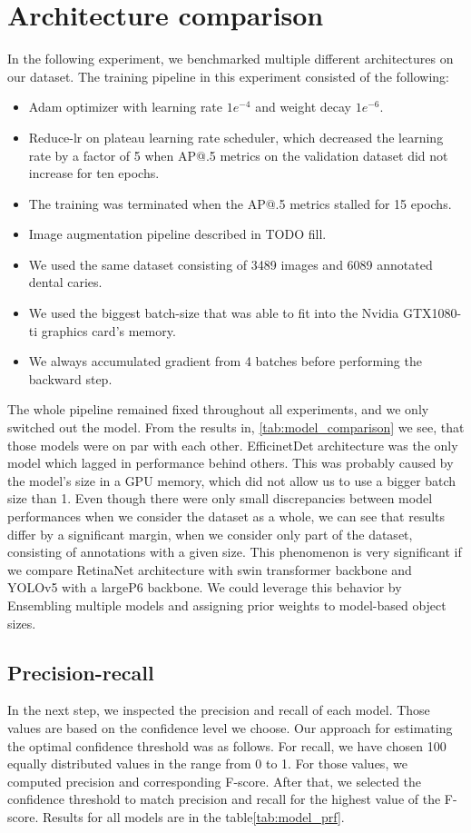 \section{Architecture comparison}
In the following experiment, we benchmarked multiple different architectures on our dataset. The training pipeline in this experiment consisted of the following:
\begin{itemize}
    \item  Adam optimizer with learning rate $1e^{-4}$ and weight decay $1e^{-6}$.
    \item Reduce-lr on plateau learning rate scheduler, which decreased the learning rate by a factor of 5 when AP@.5 metrics on the validation dataset did not increase for ten epochs.
    \item The training was terminated when the AP@.5 metrics stalled for 15 epochs.
    \item Image augmentation pipeline described in TODO fill.
    \item We used the same dataset consisting of 3489 images and 6089 annotated dental caries.
    \item We used the biggest batch-size that was able to fit into the Nvidia GTX1080-ti graphics card's memory.
    \item We always accumulated gradient from 4 batches before performing the backward step.
\end{itemize}
The whole pipeline remained fixed throughout all experiments, and we only switched out the model. From the results in, \ref{tab:model_comparison} we see, that those models were on par with each other. EfficinetDet architecture was the only model which lagged in performance behind others. This was probably caused by the model's size in a GPU memory, which did not allow us to use a bigger batch size than 1. Even though there were only small discrepancies between model performances when we consider the dataset as a whole, we can see that results differ by a significant margin, when we consider only part of the dataset, consisting of annotations with a given size. This phenomenon is very significant if we compare RetinaNet architecture with swin transformer backbone and YOLOv5 with a largeP6 backbone. We could leverage this behavior by Ensembling multiple models and assigning prior weights to model-based object sizes.
\subsection{Precision-recall}
In the next step, we inspected the precision and recall of each model. Those values are based on the confidence level we choose. Our approach for estimating the optimal confidence threshold was as follows. For recall, we have chosen 100 equally distributed values in the range from 0 to 1. For those values, we computed precision and corresponding F-score. After that, we selected the confidence threshold to match precision and recall for the highest value of the F-score. Results for all models are in the table\ref{tab:model_prf}.


